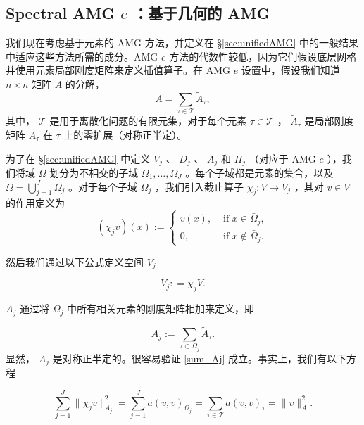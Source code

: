 \documentclass[12pt]{acta_2011xz}
\begin{document}
 
   

   \subsection{Spectral AMG    $e$   ：基于几何的 AMG  }       \label{s:AMGe}    我们现在考虑基于元素的 AMG 方法，并定义在 
   \S       \ref{sec:unifiedAMG}    中的一般结果中适应这些方法所需的成分。AMG    $e$    方法的代数性较低，因为它们假设底层网格并使用元素局部刚度矩阵来定义插值算子。在 AMG    $e$    设置中，假设我们知道    $n\times n$    矩阵    $A$    的分解，
   \begin{equation}
    A=\sum_{\tau\in \mathcal T}\tilde A_{\tau},
\end{equation}    其中，   $\mathcal T$    是用于离散化问题的有限元集，对于每个元素    $\tau\in \mathcal T$    ，   $\tilde
A_\tau$    是局部刚度矩阵    $A_{\tau}$    在    $\tau$    上的零扩展（对称正半定）。  

为了在    \S       \ref{sec:unifiedAMG}    中定义    $V_j$    、    $D_j$    、    $A_j$    和    $\Pi_j$    （对应于 AMG    $e$    ），我们将域    $\Omega$    划分为不相交的子域    $\Omega_1, \dots, \Omega_J$    。每个子域都是元素的集合，以及    $\bar \Omega =\bigcup_{j=1}^J\bar \Omega_j$    。对于每个子域    $\Omega_j$    ，我们引入截止算子    $\chi_j: V\mapsto V_j$    ，其对    $v\in V$    的作用定义为 
   \begin{equation}\label{cutoff}
    (\chi_jv)(x):= \begin{cases}
        v(x), & \text{ if } x\in \bar \Omega_j, \\ 
        0, & \text{ if } x\notin \bar \Omega_j.
    \end{cases}
\end{equation}     

然后我们通过以下公式定义空间    $V_j$   

   \begin{equation}
    V_j: = \chi_j V.
\end{equation}   

   $A_j$    通过将    $\Omega_j$    中所有相关元素的刚度矩阵相加来定义，即

   \begin{equation}
    A_j:=\sum_{\tau\subset\Omega_j}\tilde A_{\tau}.
\end{equation}    显然，   $A_j$    是对称正半定的。很容易验证    \eqref{sum_Aj}    成立。事实上，我们有以下方程

   \begin{equation}
    \sum_{j=1}^J\|\chi_jv\|_{A_j}^2 = \sum_{j=1}^J a(v, v)_{\Omega_j} = \sum_{\tau\in \mathcal T} a(v, v)_{\tau} =\|v\|_A^2.
\end{equation}     
\end{document}
